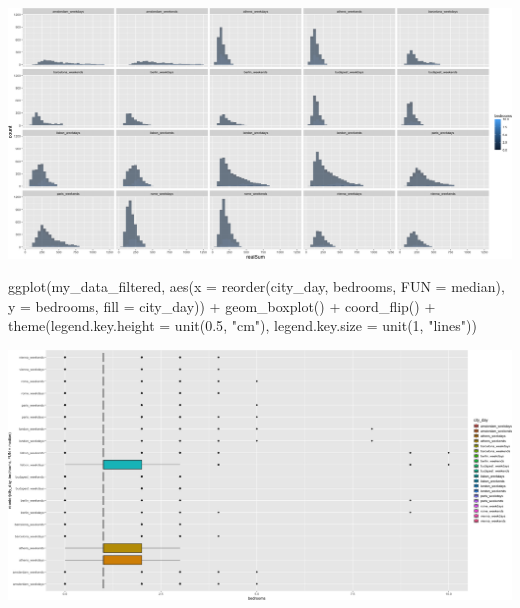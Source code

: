 \documentclass[
]{article}
\newenvironment{Shaded}{\begin{snugshade}}{\end{snugshade}}
\newcommand{\AttributeTok}[1]{\textcolor[rgb]{0.77,0.63,0.00}{#1}}
\newcommand{\DecValTok}[1]{\textcolor[rgb]{0.00,0.00,0.81}{#1}}
\newcommand{\FloatTok}[1]{\textcolor[rgb]{0.00,0.00,0.81}{#1}}
\newcommand{\FunctionTok}[1]{\textcolor[rgb]{0.00,0.00,0.00}{#1}}
\newcommand{\NormalTok}[1]{#1}
\newcommand{\SpecialCharTok}[1]{\textcolor[rgb]{0.00,0.00,0.00}{#1}}
\newcommand{\StringTok}[1]{\textcolor[rgb]{0.31,0.60,0.02}{#1}}
\begin{document}
\includegraphics{Project_files/figure-latex/unnamed-chunk-25-3.png}

\begin{Shaded}
\begin{Highlighting}[]
\FunctionTok{ggplot}\NormalTok{(my\_data\_filtered, }\FunctionTok{aes}\NormalTok{(}\AttributeTok{x =} \FunctionTok{reorder}\NormalTok{(city\_day, bedrooms,}
    \AttributeTok{FUN =}\NormalTok{ median), }\AttributeTok{y =}\NormalTok{ bedrooms, }\AttributeTok{fill =}\NormalTok{ city\_day)) }\SpecialCharTok{+} \FunctionTok{geom\_boxplot}\NormalTok{() }\SpecialCharTok{+}
    \FunctionTok{coord\_flip}\NormalTok{() }\SpecialCharTok{+} \FunctionTok{theme}\NormalTok{(}\AttributeTok{legend.key.height =} \FunctionTok{unit}\NormalTok{(}\FloatTok{0.5}\NormalTok{, }\StringTok{"cm"}\NormalTok{),}
    \AttributeTok{legend.key.size =} \FunctionTok{unit}\NormalTok{(}\DecValTok{1}\NormalTok{, }\StringTok{"lines"}\NormalTok{))}
\end{Highlighting}
\end{Shaded}

\includegraphics{Project_files/figure-latex/unnamed-chunk-26-1.png}

\begin{Shaded}
\end{Shaded}
\end{document}

